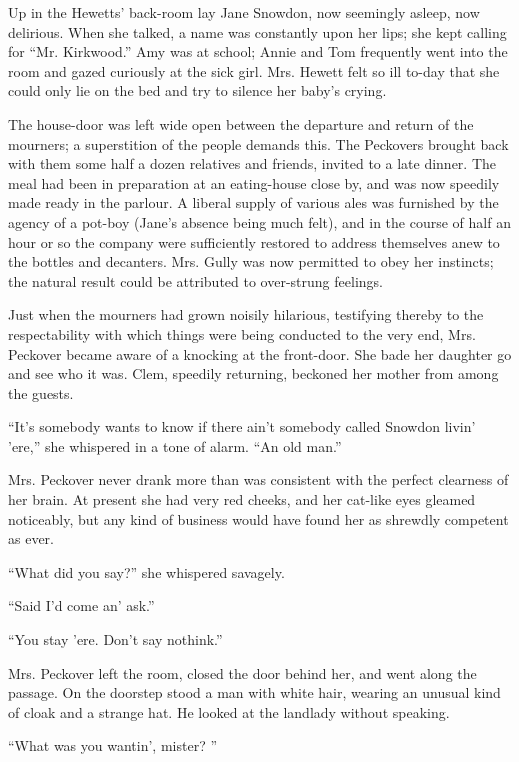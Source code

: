 Up in the Hewetts' back-room lay Jane Snowdon, now seemingly asleep, now
delirious. When she talked, a name was constantly upon her lips; she
kept calling for ``Mr. Kirkwood.'' Amy was at school; Annie and Tom
frequently went into the room and gazed curiously at the sick girl. Mrs.
Hewett felt so ill to-day that she could only lie on the bed and try to
silence her baby's crying.

The house-door was left wide open between the departure and return of
the mourners; a superstition of the people demands this. The Peckovers
brought back with them some half a dozen relatives and friends, invited
to a late dinner. The meal had been in preparation at an eating-house
close by, and was now speedily made ready in the parlour. A liberal
supply of various ales was furnished by the agency of a pot-boy (Jane's
absence being {\protect\hypertarget{104}{}{}}much felt), and in the
course of half an hour or so the company were sufficiently restored to
address themselves anew to the bottles and decanters. Mrs. Gully was now
permitted to obey her instincts; the natural result could be attributed
to over-strung feelings.

Just when the mourners had grown noisily hilarious, testifying thereby
to the respectability with which things were being conducted to the very
end, Mrs. Peckover became aware of a knocking at the front-door. She
bade her daughter go and see who it was. Clem, speedily returning,
beckoned her mother from among the guests.

``It's somebody wants to know if there ain't somebody called Snowdon
livin' 'ere,'' she whispered in a tone of alarm. ``An old man.''

Mrs. Peckover never drank more than was consistent with the perfect
clearness of her brain. At present she had very red cheeks, and her
cat-like eyes gleamed noticeably, but any kind of business would have
found her as shrewdly competent as ever.

{\protect\hypertarget{105}{}{}}``What did you say?'' she whispered
savagely.

``Said I'd come an' ask.''

``You stay 'ere. Don't say nothink.''

Mrs. Peckover left the room, closed the door behind her, and went along
the passage. On the doorstep stood a man with white hair, wearing an
unusual kind of cloak and a strange hat. He looked at the landlady
without speaking.

``What was you wantin', mister? ''

